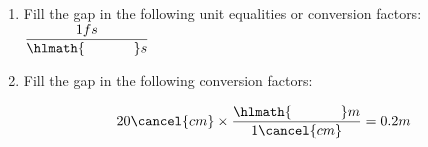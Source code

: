 \documentclass[main.tex]{subfiles}
\begin{document}
\begin{multicols*}{2}
\begin{enumerate}
\item Fill the gap in the following unit equalities or conversion factors:
$\dfrac{1fs}{\hlmath{\hspace{35pt }}s}$
\begin{enumerate}[label=(\alph*)]
\end{enumerate}
\item Fill the gap in the following conversion factors:
\begin{center}\[ 20\cancel{cm} \times \dfrac{ \hlmath{\hspace{35pt}}m }{1\cancel{cm}}=0.2m\]\end{center}
\begin{enumerate}[label=(\alph*)]
\end{enumerate}







\end{enumerate}
\end{multicols*}
\end{document}
